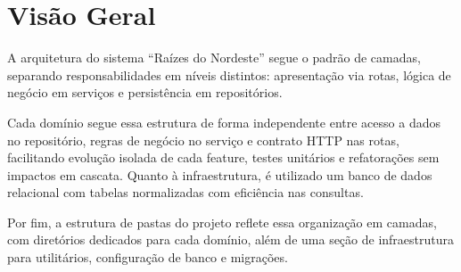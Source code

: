 \section{Visão Geral}

\hspace{0.5cm} A arquitetura do sistema ``Raízes do Nordeste'' segue o padrão de camadas,
separando responsabilidades em níveis distintos: apresentação via rotas, lógica de negócio em serviços
e persistência em repositórios.

Cada domínio segue essa estrutura de forma independente entre acesso a dados no repositório,
regras de negócio no serviço e contrato HTTP nas rotas, facilitando evolução isolada de cada feature, testes unitários e refatorações sem impactos em cascata.
Quanto à infraestrutura, é utilizado um banco de dados relacional com tabelas normalizadas com eficiência nas consultas.

Por fim, a estrutura de pastas do projeto reflete essa organização em camadas, com diretórios dedicados para cada domínio,
além de uma seção de infraestrutura para utilitários, configuração de banco e migrações.
